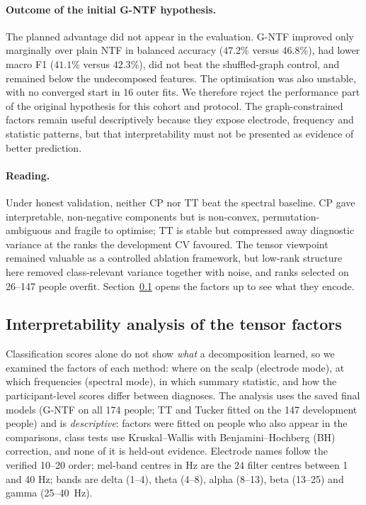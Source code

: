 \documentclass[10pt,twocolumn,a4paper]{article}
\begin{document}
\paragraph{Outcome of the initial G-NTF hypothesis.} The planned advantage did not appear in the evaluation. G-NTF improved only marginally over plain NTF in balanced accuracy ($47.2\%$ versus $46.8\%$), had lower macro F1 ($41.1\%$ versus $42.3\%$), did not beat the shuffled-graph control, and remained below the undecomposed features. The optimisation was also unstable, with no converged start in 16 outer fits. We therefore reject the performance part of the original hypothesis for this cohort and protocol. The graph-constrained factors remain useful descriptively because they expose electrode, frequency and statistic patterns, but that interpretability must not be presented as evidence of better prediction.

\paragraph{Reading.} Under honest validation, neither CP nor TT beat the spectral baseline. CP gave interpretable, non-negative components but is non-convex, permutation-ambiguous and fragile to optimise; TT is stable but compressed away diagnostic variance at the ranks the development CV favoured. The tensor viewpoint remained valuable as a controlled ablation framework, but low-rank structure here removed class-relevant variance together with noise, and ranks selected on 26--147 people overfit. Section~\ref{sec:tensorinterp} opens the factors up to see what they encode.

\subsection{Interpretability analysis of the tensor factors}
\label{sec:tensorinterp}
Classification scores alone do not show \emph{what} a decomposition learned, so we examined the factors of each method: where on the scalp (electrode mode), at which frequencies (spectral mode), in which summary statistic, and how the participant-level scores differ between diagnoses. The analysis uses the saved final models (G-NTF on all 174 people; TT and Tucker fitted on the 147 development people) and is \emph{descriptive}: factors were fitted on people who also appear in the comparisons, class tests use Kruskal--Wallis with Benjamini--Hochberg (BH) correction, and none of it is held-out evidence. Electrode names follow the verified 10--20 order; mel-band centres in Hz are the 24 filter centres between 1 and 40 Hz; bands are delta (1--4), theta (4--8), alpha (8--13), beta (13--25) and gamma (25--40~Hz).
\end{document}
